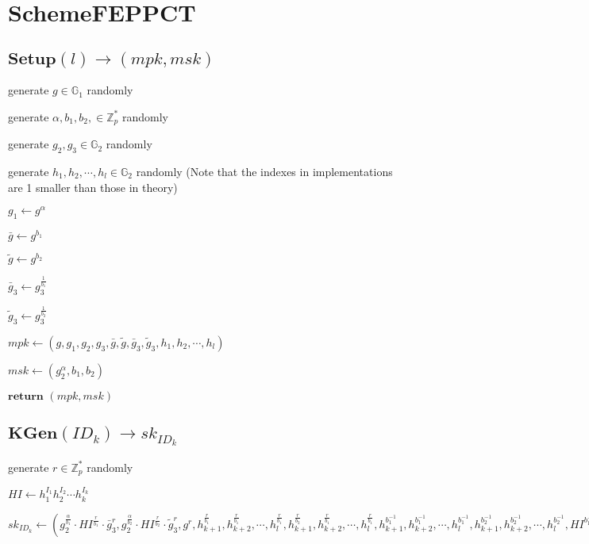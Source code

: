 \documentclass[a4paper]{article}
\begin{document}
\section{SchemeFEPPCT}

\subsection{$\textbf{Setup}(l) \rightarrow (\textit{mpk}, \textit{msk})$}

generate $g \in \mathbb{G}_1$ randomly

generate $\alpha, b_1, b_2, \in \mathbb{Z}_p^*$ randomly

generate $g_2, g_3 \in \mathbb{G}_2$ randomly

generate $h_1, h_2, \cdots, h_l \in \mathbb{G}_2$ randomly (Note that the indexes in implementations are 1 smaller than those in theory)

$g_1 \gets g^\alpha$

$\bar{g} \gets g^{b_1}$

$\tilde{g} \gets g^{b_2}$

$\bar{g}_3 \gets g_3^{\frac{1}{b_1}}$

$\tilde{g}_3 \gets g_3^{\frac{1}{b_2}}$

$\textit{mpk} \gets (g, g_1, g_2, g_3, \bar{g}, \tilde{g}, \bar{g}_3, \tilde{g}_3, h_1, h_2, \cdots, h_l)$

$\textit{msk} \gets (g_2^\alpha, b_1, b_2)$

$\textbf{return }(\textit{mpk}, \textit{msk})$

\subsection{$\textbf{KGen}(\textit{ID}_k) \rightarrow \textit{sk}_{\textit{ID}_k}$}

generate $r \in \mathbb{Z}_p^*$ randomly

$\textit{HI} \gets h_1^{I_1}h_2^{I_2}\cdots h_k^{I_k}$

$\textit{sk}_{\textit{ID}_k} \gets (
g_2^{\frac{\alpha}{b_1}} \cdot \textit{HI}^{\frac{r}{b_1}} \cdot \bar{g}_3^r, 
g_2^{\frac{\alpha}{b_2}} \cdot \textit{HI}^{\frac{r}{b_2}} \cdot \tilde{g}_3^r, 
g^r, 
h_{k + 1}^{\frac{r}{b_1}}, h_{k + 2}^{\frac{r}{b_1}}, \cdots, h_l^{\frac{r}{b_1}}, 
h_{k + 1}^{\frac{r}{b_2}}, h_{k + 2}^{\frac{r}{b_1}}, \cdots, h_l^{\frac{r}{b_1}}, 
h_{k + 1}^{b_1^{-1}}, h_{k + 2}^{b_1^{-1}}, \cdots, h_l^{b_1^{-1}}, 
h_{k + 1}^{b_2^{-1}}, h_{k + 2}^{b_2^{-1}}, \cdots, h_l^{b_2^{-1}}, 
\textit{HI}^{b_1^{-1}}, \textit{HI}^{b_2^{-1}}
)$
\end{document}
